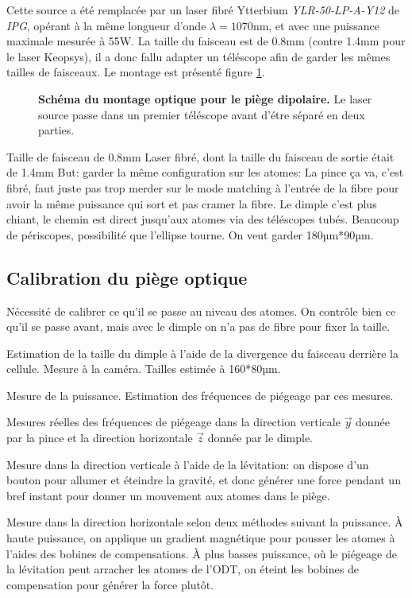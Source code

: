 Cette source a été remplacée par un laser fibré Ytterbium \emph{YLR-50-LP-A-Y12} de \emph{IPG}, opérant à la même longueur d'onde $\lambda=1070$nm, et avec une puissance maximale mesurée à 55W. La taille du faisceau est de 0.8mm (contre 1.4mm pour le laser Keopsys), il a donc fallu adapter un téléscope afin de garder les mêmes tailles de faisceaux. Le montage est présenté figure \ref{fig:optique_1070}.

\begin{figure}
\centering

\caption{\textbf{Schéma du montage optique pour le piège dipolaire.} Le laser source passe dans un premier téléscope avant d'étre séparé en deux parties.}
\label{fig:optique_1070}
\end{figure}



Taille de faisceau de 0.8mm
Laser fibré, dont la taille du faisceau de sortie était de 1.4mm
But: garder la même configuration sur les atomes: La pince ça va, c'est fibré, faut juste pas trop merder sur le mode matching à l'entrée de la fibre pour avoir la même puissance qui sort et pas cramer la fibre.
Le dimple c'est plus chiant, le chemin est direct jusqu'aux atomes via des téléscopes tubés. Beaucoup de périscopes, possibilité que l'ellipse tourne. On veut garder 180µm*90µm.


\subsection{Calibration du piège optique}
Nécessité de calibrer ce qu'il se passe au niveau des atomes. On contrôle bien ce qu'il se passe avant, mais avec le dimple on n'a pas de fibre pour fixer la taille. 

Estimation de la taille du dimple à l'aide de la divergence du faisceau derrière la cellule. Mesure à la caméra. Tailles estimée à 160*80µm. 

Mesure de la puissance. Estimation des fréquences de piégeage par ces mesures.

Mesures réelles des fréquences de piégeage dans la direction verticale $\vec{y}$ donnée par la pince et la direction horizontale $\vec{z}$ donnée par le dimple.

Mesure dans la direction verticale à l'aide de la lévitation: on dispose d'un bouton pour allumer et éteindre la gravité, et donc générer une force pendant un bref instant pour donner un mouvement aux atomes dans le piège.

Mesure dans la direction horizontale selon deux méthodes suivant la puissance. À haute puissance, on applique un gradient magnétique pour pousser les atomes à l'aides des bobines de compensations. À plus basses puissance, où le piégeage de la lévitation peut arracher les atomes de l'ODT, on éteint les bobines de compensation pour générer la force plutôt. 

